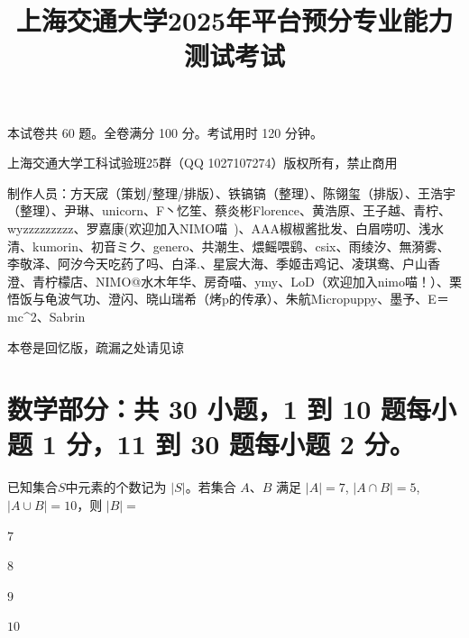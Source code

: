 \documentclass{exam-zh}
\title{上海交通大学2025年平台预分专业能力测试考试}
\begin{document}


\maketitle

本试卷共 60 题。全卷满分 100 分。考试用时 120 分钟。


\begin{notice}
  \item 上海交通大学工科试验班25群（QQ 1027107274）版权所有，禁止商用
  \item 制作人员：方天{宬}（策划/整理/排版）、铁镐镐（整理）、陈翎玺（排版）、王浩宇（整理）、尹琳、unicorn、F丶忆笙、蔡炎彬Florence、黄浩原、王子越、青柠、wyzzzzzzzzz、罗嘉康(欢迎加入NIMO喵~)、AAA椒椒酱批发、白眉唠叨、浅水清、kumorin、初音ミク、genero、共潮生、煨鳐喂鹞、csix、雨绫汐、無漪雾、李敬泽、阿汐今天吃药了吗、白泽.、星宸大海、季姬击鸡记、凌琪鸯、户山香澄、青柠檬店、NIMO@水木年华、房奇喵、ymy、LoD（欢迎加入nimo喵！）、栗悟饭与龟波气功、澄闪、晓山瑞希（烤p的传承）、朱航Micropuppy、墨予、E＝mc\textasciicircum{}2、Sabrin
  \item 本卷是回忆版，疏漏之处请见谅
\end{notice}



\section{%
  数学部分：共 30 小题，1 到 10 题每小题 1 分，11 到 30 题每小题 2 分。
}


\begin{question}
已知集合$S$中元素的个数记为 $|S|$。若集合 $A$、$B$ 满足 $|A|=7$, $|A\cap B|=5$, $|A\cup B|=10$，则 $|B|=$ \paren[]
\begin{choices}
  \item $7$
  \item $8$
  \item $9$
  \item $10$
\end{choices}
\end{question}
\end{document}
